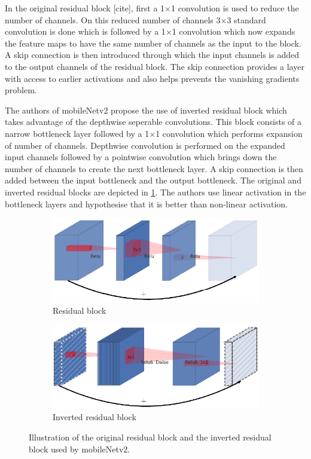 In the original residual block [cite], first a 1$\times$1 convolution is used to reduce the number of channels. On this reduced number of channels 3$\times$3 standard convolution is done which is followed by a 1$\times$1 convolution which now expands the feature maps to have the same number of channels as the input to the block. A skip connection is then introduced through which the input channels is added to the output channels of the residual block. The skip connection provides a layer with access to earlier activations and also helps prevents the vanishing gradients problem. 

The authors of mobileNetv2 propose the use of inverted residual block which takes advantage of the depthwise seperable convolutions. This block consists of a narrow bottleneck layer followed by a 1$\times$1 convolution which performs expansion of number of channels. Depthwise convolution is performed on the expanded input channels followed by a pointwise convolution which brings down the number of channels to create the next bottleneck layer. A skip connection is then added between the input bottleneck and the output bottleneck. The original and inverted residual blocks are depicted in \ref{Fig:residual}. The authors use linear activation in the bottleneck layers and hypothesise that it is better than non-linear activation.

	\begin{figure}[!htb]
		\begin{subfigure}{.5\textwidth}
			\centering
			\includegraphics[width=.8\linewidth]{images/residual}
			\caption{Residual block}
		\end{subfigure}
		\begin{subfigure}{.5\textwidth}
			\centering
			\includegraphics[width=.8\linewidth]{images/inverted_residual}
			\caption{Inverted residual block}
		\end{subfigure}
		\caption{Illustration of the original residual block and the inverted residual block used by mobileNetv2.}
		\label{Fig:residual}
	\end{figure}

